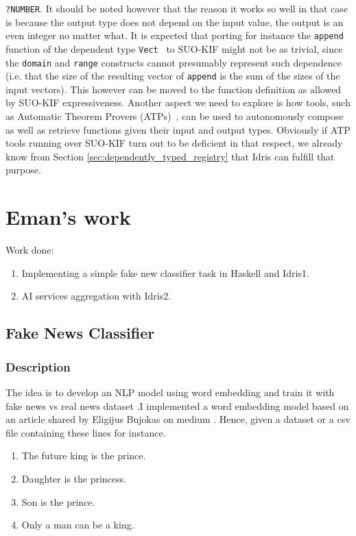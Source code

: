 \documentclass[]{report}
\begin{document}
\begin{itemize}
\texttt{?NUMBER}.  It should be noted however that the reason it works
so well in that case is because the output type does not depend on the
input value, the output is an even integer no matter what.  It is
expected that porting for instance the \texttt{append} function of
the dependent type \texttt{Vect}~\cite{Vectors} to SUO-KIF might not
be as trivial, since the \texttt{domain} and \texttt{range} constructs
cannot presumably represent such dependence (i.e. that the size of
the resulting vector of \texttt{append} is the sum of the sizes of the input vectors).  This however can be
moved to the function definition as allowed by SUO-KIF expressiveness.
Another aspect we need to explore is how tools, such as Automatic
Theorem Provers (ATPs)~\cite{Baumgartner_automatedreasoning,
  Urban_anoverview, Alvez_evaluating_atp_adimen_SUMO}, can be used to
autonomously compose as well as retrieve functions given their input
and output types.  Obviously if ATP tools running over SUO-KIF turn
out to be deficient in that respect, we already know from Section
\ref{sec:dependently_typed_registry} that Idris can fulfill that purpose.
\end{itemize}

\chapter{Eman's work}
Work done:
\begin{enumerate}
    \item Implementing a simple fake new classifier task in Haskell and Idris1.
    \item AI services aggregation with Idris2.
\end{enumerate}

\section{Fake News Classifier}
\subsection{Description}
The idea is to develop an NLP model using word embedding and train it with 
fake news vs real news dataset \cite{Kaggle_Datasets}.I implemented a word 
embedding model based on an article shared by Eligijus Bujokas on medium \cite{Word_embedding}. 
Hence, given a dataset or a csv file containing these lines for instance.

\begin{enumerate}
    \item The future king is the prince.
    \item Daughter is the princess.
    \item Son is the prince.
    \item Only a man can be a king. 
\end{enumerate}
\end{document}
